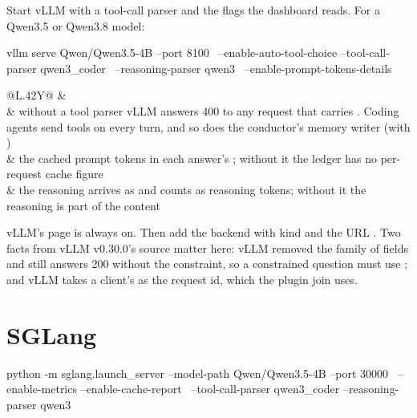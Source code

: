 Start vLLM with a tool-call parser and the flags the dashboard reads. For a Qwen3.5 or Qwen3.8 model:

\begin{shell}
vllm serve Qwen/Qwen3.5-4B --port 8100 \
    --enable-auto-tool-choice --tool-call-parser qwen3_coder \
    --reasoning-parser qwen3 \
    --enable-prompt-tokens-details
\end{shell}

\begin{table}[htbp]
\centering\small
\caption{The vLLM flags the proxy needs, and why.}\label{tab:vllm-flags}
\begin{tabularx}{\linewidth}{@{}L{.42\linewidth}Y@{}}
\toprule
\hd{flag} & \hd{why} \\
\midrule
{} & without a tool parser vLLM answers 400 to any request that carries . Coding agents send tools on every turn, and so does the conductor's memory writer (with ) \\
 & the cached prompt tokens in each answer's ; without it the ledger has no per-request cache figure \\
 & the reasoning arrives as  and counts as reasoning tokens; without it the reasoning is part of the content \\
\bottomrule
\end{tabularx}
\end{table}

vLLM's  page is always on. Then add the backend with kind  and the URL . Two facts from vLLM v0.30.0's source matter here: vLLM removed the  family of fields and still answers 200 without the constraint, so a constrained question must use ; and vLLM takes a client's  as the request id, which the plugin join uses.

\section{SGLang}

\begin{shell}
python -m sglang.launch_server --model-path Qwen/Qwen3.5-4B --port 30000 \
    --enable-metrics --enable-cache-report \
    --tool-call-parser qwen3_coder --reasoning-parser qwen3
\end{shell}

